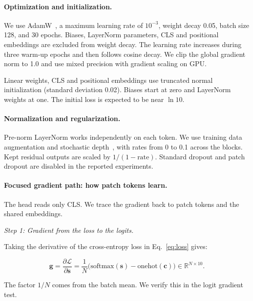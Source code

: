 \documentclass{article}
\begin{document}
\paragraph{Optimization and initialization.}
We use AdamW~\citep{loshchilov2019decoupled}, a maximum learning rate of $10^{-3}$, weight decay 0.05, batch size 128, and 30 epochs. Biases, LayerNorm parameters, CLS and positional embeddings are excluded from weight decay. The learning rate increases during three warm-up epochs and then follows cosine decay. We clip the global gradient norm to 1.0 and use mixed precision with gradient scaling on GPU.

Linear weights, CLS and positional embeddings use truncated normal initialization (standard deviation 0.02). Biases start at zero and LayerNorm weights at one. The initial loss is expected to be near $\ln 10$.

\paragraph{Normalization and regularization.}
Pre-norm LayerNorm works independently on each token. We use training data augmentation and stochastic depth~\citep{huang2016deep}, with rates from 0 to 0.1 across the blocks. Kept residual outputs are scaled by $1/(1-\text{rate})$. Standard dropout and patch dropout are disabled in the reported experiments.

\paragraph{Focused gradient path: how patch tokens learn.}
The head reads only CLS. We trace the gradient back to patch tokens and the shared embeddings.

\emph{Step 1: Gradient from the loss to the logits.}

Taking the derivative of the cross-entropy loss in
Eq.~\ref{eq:loss} gives:

\begin{equation}
\mathbf{g} = \frac{\partial\mathcal{L}}{\partial\mathbf{s}}
= \frac{1}{N}
\big(\mathrm{softmax}(\mathbf{s})
- \mathrm{onehot}(\mathbf{c})\big)
\in\mathbb{R}^{N\times10}.
\label{eq:dlogits}
\end{equation}

The factor $1/N$ comes from the batch mean. We verify this in the logit gradient test.
\end{document}
